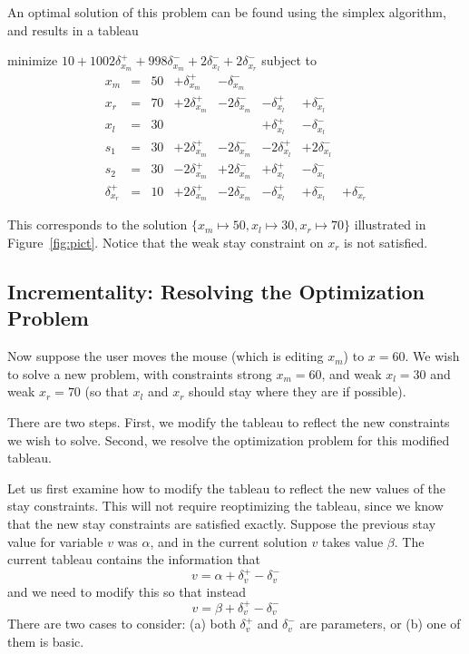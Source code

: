 \documentclass{article}
\newcommand{\strength}{\rm}
\begin{document}
An optimal solution of this problem can be found using the simplex algorithm,
and results in a tableau
\begin{trivlist}\item
minimize $10 + 1002 \delta_{x_m}^+ + 998 \delta_{x_m}^-  + 2
\delta_{x_l}^- + 2\delta_{x_r}^- $ 
subject to 
$$
\begin{array}{rlrrrrrr} 
x_m & = &50 &  + \delta_{x_m}^+ & - \delta_{x_m}^- \\
x_r & = &70 & + 2 \delta_{x_m}^+ & - 2\delta_{x_m}^- &
		- \delta_{x_l}^+ & + \delta_{x_l}^- \\ \hline
x_l & = & 30  & & & + \delta_{x_l}^+ & - \delta_{x_l}^- \\
s_1 & = &30 &  + 2 \delta_{x_m}^+ & - 2\delta_{x_m}^- &
		-2 \delta_{x_l}^+ & +2 \delta_{x_l}^- \\
s_2 & = &30 &   - 2 \delta_{x_m}^+ &+2\delta_{x_m}^- &
		+ \delta_{x_l}^+ & - \delta_{x_l}^- \\
\delta_{x_r}^+ & = & 10 & + 2 \delta_{x_m}^+  & - 2\delta_{x_m}^- &
	- \delta_{x_l}^+ & + \delta_{x_l}^- & +\delta_{x_r}^-
\end{array}
$$
\end{trivlist}
This corresponds to the solution
$\{x_m \mapsto 50, x_l \mapsto 30, x_r \mapsto 70\}$
illustrated in Figure~\ref{fig:pict}.
Notice that the weak stay constraint on $x_r$ is not satisfied.

\subsection{Incrementality: Resolving the Optimization Problem}
\label{resolving}

Now suppose the user moves the mouse (which
is editing $x_m$) to $x=60$.
We wish to solve a new problem, with
constraints {\strength strong} $x_m = 60$, and
{\strength weak} $x_l = 30$ and {\strength weak} $x_r = 70$
(so that $x_l$ and $x_r$ should stay where they are if possible).


There are two steps.  First, we modify the tableau to reflect the new
constraints we wish to solve.  Second, we resolve the optimization problem
for this modified tableau.

Let us first examine how to modify the tableau to reflect the new values of
the stay constraints.  This will not require reoptimizing the tableau,
since we know that the new stay constraints are satisfied exactly.
Suppose the previous stay value for variable $v$ was $\alpha$, and in the
current solution $v$ takes value $\beta$.  The current tableau contains the
information that 
$$v = \alpha + \delta_v^+ - \delta_v^-$$
and we need to
modify this so that instead 
$$v = \beta + \delta_v^+ - \delta_v^-$$
There
are two cases to consider: (a) both $\delta_v^+$ and $\delta_v^-$ are
parameters, or (b) one of them is basic.
\end{document}
